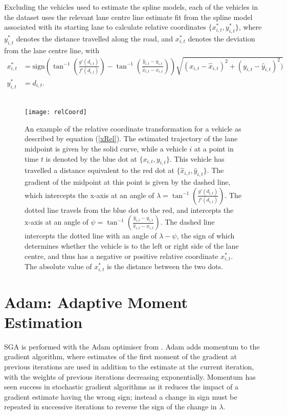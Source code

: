 \documentclass[12pt,a4paper]{article}\usepackage[]{graphicx}\usepackage[]{color}
\begin{document}
Excluding the vehicles used to estimate the spline models, each of the vehicles in the dataset uses the relevant lane centre line estimate fit from the spline model associated with its starting lane to calculate relative coordinates $\{x^*_{i, t}, y^*_{i, t}\}$, where $y^*_{i, t}$ denotes the distance travelled along the road, and $x^*_{i, t}$ denotes the deviation from the lane centre line, with
\begin{align}
x^*_{i, t} &= \mbox{sign}\left(\tan^{-1}\left(\frac{g'(d_{i, t}) }{f'(d_{i, t})}\right) - \tan^{-1}\left(\frac{\hat{y}_{i, t} - y_{i, t}}{\hat{x}_{i, t} - x_{i, t}} \right)\right)\sqrt{(x_{i, t}-\hat{x}_{i, t})^2 + (y_{i, t} - \hat{y}_{i, t})^2)} \label{xRel} \\
y^*_{i, t} &= d_{i, t}. \label{yRel}
\end{align}
\\

\begin{figure}
\centering
\texttt{[image: relCoord]}
\caption{An example of the relative coordinate transformation for a vehicle as described by equation (\ref{xRel}). The estimated trajectory of the lane midpoint is given by the solid curve, while a vehicle $i$ at a point in time $t$ is denoted by the blue dot at $\{x_{i, t}, y_{i, t}\}$. This vehicle has travelled a distance equivalent to the red dot at $\{\hat{x}_{i, t}, \hat{y}_{i, t}\}$. The gradient of the midpoint at this point is given by the dashed line, which intercepts the x-axis at an angle of $\lambda = \tan^{-1}\left(\frac{g'(d_{i, t}) }{f'(d_{i, t})}\right)$. The dotted line travels from the blue dot to the red, and intercepts the x-axis at an angle of $\psi = \tan^{-1}\left(\frac{\hat{y}_{i, t} - y_{i, t}}{\hat{x}_{i, t} - x_{i, t}} \right)$. The dashed line intercepts the dotted line with an angle  of $\lambda - \psi$, the sign of which determines whether the vehicle is to the left or right side of the lane centre, and thus has a negative or positive relative coordinate $x^*_{i, t}$. The absolute value of $x^*_{i, t}$ is the distance between the two dots.}
\label{fig:relCoord}
\end{figure}

\section{Adam: Adaptive Moment Estimation}

SGA is performed with the Adam optimiser from \citet{Kingma2015b}. Adam adds momentum to the gradient algorithm, where estimates of the first moment of the gradient at previous iterations are used in addition to the estimate at the current iteration, with the weights of previous iterations decreasing exponentially. Momentum \citep{Qian1999} has seen success in stochastic gradient algorithms as it reduces the impact of a gradient estimate having the wrong sign; instead a change in sign must be repeated in successive iterations to reverse the sign of the change in $\lambda$. 
\\
\end{document}
